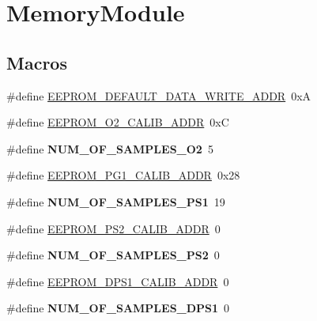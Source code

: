 \hypertarget{group___memory_module}{}\section{Memory\+Module}
\label{group___memory_module}
\subsection*{Macros}
\begin{DoxyCompactItemize}
\item 
\#define \hyperlink{group___memory_module_gae4572214c9a22bb1a153a724ed27f315}{E\+E\+P\+R\+O\+M\+\_\+\+D\+E\+F\+A\+U\+L\+T\+\_\+\+D\+A\+T\+A\+\_\+\+W\+R\+I\+T\+E\+\_\+\+A\+D\+DR}~0xA
\item 
\#define \hyperlink{group___memory_module_ga43f2f0190c9e0daa8bb5941202d82d3e}{E\+E\+P\+R\+O\+M\+\_\+\+O2\+\_\+\+C\+A\+L\+I\+B\+\_\+\+A\+D\+DR}~0xC
\item 
\mbox{\label{group___memory_module_ga1dd912ed43ad9d914659374252aec284}} 
\#define {\bfseries N\+U\+M\+\_\+\+O\+F\+\_\+\+S\+A\+M\+P\+L\+E\+S\+\_\+\+O2}~5
\item 
\#define \hyperlink{group___memory_module_gacdd02d6c42e891e26869420437a1a064}{E\+E\+P\+R\+O\+M\+\_\+\+P\+G1\+\_\+\+C\+A\+L\+I\+B\+\_\+\+A\+D\+DR}~0x28
\item 
\mbox{\label{group___memory_module_ga659643ca4bbaf6d35f26d091951ba974}} 
\#define {\bfseries N\+U\+M\+\_\+\+O\+F\+\_\+\+S\+A\+M\+P\+L\+E\+S\+\_\+\+P\+S1}~19
\item 
\#define \hyperlink{group___memory_module_ga71862ebe386984f27bf392b21a44d421}{E\+E\+P\+R\+O\+M\+\_\+\+P\+S2\+\_\+\+C\+A\+L\+I\+B\+\_\+\+A\+D\+DR}~0
\item 
\mbox{\label{group___memory_module_ga6da83a3c706bc600c930e2f20b87275f}} 
\#define {\bfseries N\+U\+M\+\_\+\+O\+F\+\_\+\+S\+A\+M\+P\+L\+E\+S\+\_\+\+P\+S2}~0
\item 
\#define \hyperlink{group___memory_module_gaa51b67da1feeabf8c1a7d75d9fb35d3e}{E\+E\+P\+R\+O\+M\+\_\+\+D\+P\+S1\+\_\+\+C\+A\+L\+I\+B\+\_\+\+A\+D\+DR}~0
\item 
\mbox{\label{group___memory_module_ga85d9b7b46e4571266758f5a5a718cfae}} 
\#define {\bfseries N\+U\+M\+\_\+\+O\+F\+\_\+\+S\+A\+M\+P\+L\+E\+S\+\_\+\+D\+P\+S1}~0

\end{DoxyCompactItemize}
